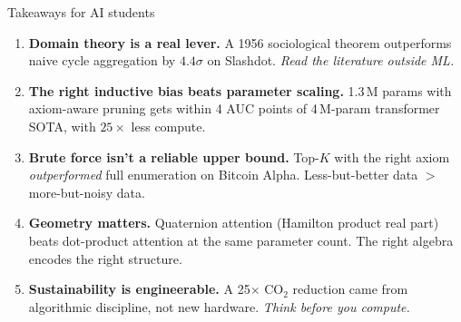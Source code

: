 \documentclass[10pt,aspectratio=169]{beamer}
\begin{document}
\begin{frame}{Takeaways for AI students}

\begin{enumerate}
\item \textbf{Domain theory is a real lever.} A 1956 sociological
      theorem outperforms naive cycle aggregation by $4.4\sigma$ on
      Slashdot. \emph{Read the literature outside ML.}
\smallskip
\item \textbf{The right inductive bias beats parameter scaling.} 1.3\,M
      params with axiom-aware pruning gets within 4 AUC points of
      4\,M-param transformer SOTA, with $25\times$ less compute.
\smallskip
\item \textbf{Brute force isn't a reliable upper bound.} Top-$K$
      with the right axiom \emph{outperformed} full enumeration on
      Bitcoin Alpha. Less-but-better data $>$ more-but-noisy data.
\smallskip
\item \textbf{Geometry matters.} Quaternion attention (Hamilton
      product real part) beats dot-product attention at the same
      parameter count. The right algebra encodes the right
      structure.
\smallskip
\item \textbf{Sustainability is engineerable.} A 25$\times$ CO$_2$
      reduction came from algorithmic discipline, not new hardware.
      \emph{Think before you compute.}
\end{enumerate}

\medskip
\centering
{}
\end{frame}
\end{document}
